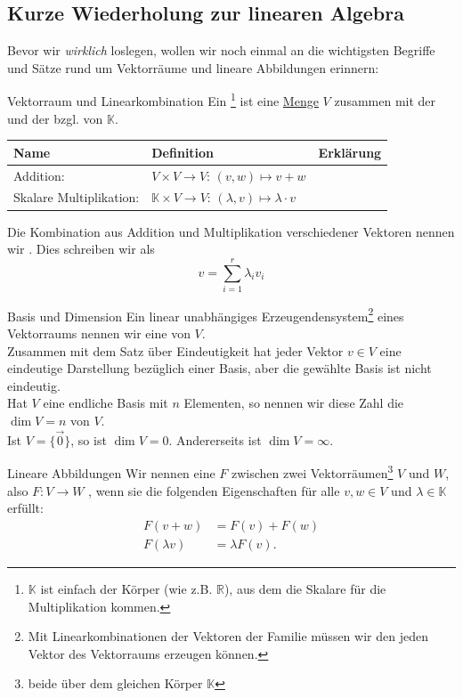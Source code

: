 \subsection{Kurze Wiederholung zur linearen Algebra}
Bevor wir \textit{wirklich }loslegen, wollen wir noch einmal an die wichtigsten Begriffe und Sätze rund um Vektorräume und lineare Abbildungen erinnern:
\begin{Wiederholung}
{Vektorraum und Linearkombination}
Ein \footnote{$\mathbb{K}$ ist einfach der Körper (wie z.B. $\mathbb{R}$), aus dem die Skalare für die Multiplikation kommen.} ist eine \underline{Menge} $V$ zusammen mit der  und der  bzgl. von $\mathbb{K}$.\\
\begin{tabular}{l|l|l}
    \textbf{Name} &\textbf{ Definition }&\textbf{ Erklärung} \\
    \hline
    Addition: & $V\times V\to V:\, (v,w)\mapsto v+w$ &\parbox[t]{5cm}{} \\
    Skalare Multiplikation: & $\mathbb{K}\times V\to V:\,(\lambda, v)\mapsto \lambda \cdot v$ & \parbox[t]{5cm}{}
\end{tabular}
Die Kombination aus Addition und Multiplikation verschiedener Vektoren nennen wir . Dies schreiben wir als
\begin{equation*}
    \boxed{v=\sum_{i=1}^r\lambda_i v_i}
\end{equation*}
\end{Wiederholung}
\begin{Wiederholung}
{Basis und Dimension}
Ein linear unabhängiges Erzeugendensystem\footnote{Mit Linearkombinationen der Vektoren der Familie müssen wir den jeden Vektor des Vektorraums erzeugen können.} eines Vektorraums nennen wir eine  von $V$.\\
Zusammen mit dem Satz über Eindeutigkeit hat jeder Vektor $v\in V$ eine eindeutige Darstellung bezüglich einer Basis, aber die gewählte Basis ist nicht eindeutig.\\
Hat $V$ eine endliche Basis mit $n$ Elementen, so nennen wir diese Zahl die  $\dim V=n$ von $V$.\\
Ist $V=\{\Vec{0}\}$, so ist $\dim V=0$. Andererseits ist $\dim V=\infty$.
\end{Wiederholung}
\begin{Wiederholung}
{Lineare Abbildungen}
Wir nennen eine  $F$ zwischen zwei Vektorräumen\footnote{beide über dem gleichen Körper $\mathbb{K}$} $V$ und $W$, also $F:V\to W$ , wenn sie die folgenden Eigenschaften für alle $v,w\in V$ und $\lambda\in\mathbb{K}$ erfüllt:
\begin{align*}
    F(v+w)&=F(v)+F(w)\\
    F(\lambda v)&=\lambda F(v).
\end{align*}
\end{Wiederholung}
